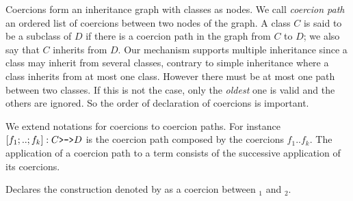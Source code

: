 Coercions form an inheritance graph with classes as nodes.  We call
{\em coercion path} an ordered list of coercions between two nodes of
the graph.  A class $C$ is said to be a subclass of $D$ if there is a
coercion path in the graph from $C$ to $D$; we also say that $C$
inherits from $D$. Our mechanism supports multiple inheritance since a
class may inherit from several classes, contrary to simple inheritance
where a class inherits from at most one class.  However there must be
at most one path between two classes.  If this is not the case, only
the {\em oldest} one is valid and the others are ignored. So the order
of declaration of coercions is important.

We extend notations for coercions to coercion paths. For instance
$[f_1;..;f_k]:C \mbox{\texttt{>->}} D$ is the coercion path composed
by the coercions $f_1..f_k$.  The application of a coercion path to a
term consists of the successive application of its coercions.








Declares the construction denoted by {\qualid} as a coercion between
{\class$_1$} and {\class$_2$}.


